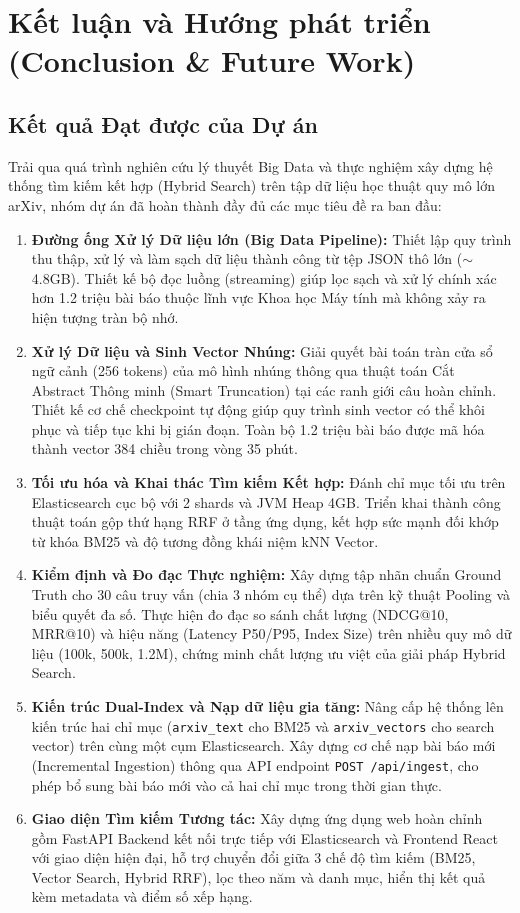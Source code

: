 \chapter{Kết luận và Hướng phát triển (Conclusion \& Future Work)}
\label{ch:conclusion}

\section{Kết quả Đạt được của Dự án}
Trải qua quá trình nghiên cứu lý thuyết Big Data và thực nghiệm xây dựng hệ thống tìm kiếm kết hợp (Hybrid Search) trên tập dữ liệu học thuật quy mô lớn arXiv, nhóm dự án đã hoàn thành đầy đủ các mục tiêu đề ra ban đầu:
\begin{enumerate}
    \item \textbf{Đường ống Xử lý Dữ liệu lớn (Big Data Pipeline):} Thiết lập quy trình thu thập, xử lý và làm sạch dữ liệu thành công từ tệp JSON thô lớn ($\sim$4.8GB). Thiết kế bộ đọc luồng (streaming) giúp lọc sạch và xử lý chính xác hơn 1.2 triệu bài báo thuộc lĩnh vực Khoa học Máy tính mà không xảy ra hiện tượng tràn bộ nhớ.
    \item \textbf{Xử lý Dữ liệu và Sinh Vector Nhúng:} Giải quyết bài toán tràn cửa sổ ngữ cảnh (256 tokens) của mô hình nhúng thông qua thuật toán Cắt Abstract Thông minh (Smart Truncation) tại các ranh giới câu hoàn chỉnh. Thiết kế cơ chế checkpoint tự động giúp quy trình sinh vector có thể khôi phục và tiếp tục khi bị gián đoạn. Toàn bộ 1.2 triệu bài báo được mã hóa thành vector 384 chiều trong vòng 35 phút.
    \item \textbf{Tối ưu hóa và Khai thác Tìm kiếm Kết hợp:} Đánh chỉ mục tối ưu trên Elasticsearch cục bộ với 2 shards và JVM Heap 4GB. Triển khai thành công thuật toán gộp thứ hạng RRF ở tầng ứng dụng, kết hợp sức mạnh đối khớp từ khóa BM25 và độ tương đồng khái niệm kNN Vector.
    \item \textbf{Kiểm định và Đo đạc Thực nghiệm:} Xây dựng tập nhãn chuẩn Ground Truth cho 30 câu truy vấn (chia 3 nhóm cụ thể) dựa trên kỹ thuật Pooling và biểu quyết đa số. Thực hiện đo đạc so sánh chất lượng (NDCG@10, MRR@10) và hiệu năng (Latency P50/P95, Index Size) trên nhiều quy mô dữ liệu (100k, 500k, 1.2M), chứng minh chất lượng ưu việt của giải pháp Hybrid Search.
    \item \textbf{Kiến trúc Dual-Index và Nạp dữ liệu gia tăng:} Nâng cấp hệ thống lên kiến trúc hai chỉ mục (\texttt{arxiv\_text} cho BM25 và \texttt{arxiv\_vectors} cho search vector) trên cùng một cụm Elasticsearch. Xây dựng cơ chế nạp bài báo mới (Incremental Ingestion) thông qua API endpoint \texttt{POST /api/ingest}, cho phép bổ sung bài báo mới vào cả hai chỉ mục trong thời gian thực.
    \item \textbf{Giao diện Tìm kiếm Tương tác:} Xây dựng ứng dụng web hoàn chỉnh gồm FastAPI Backend kết nối trực tiếp với Elasticsearch và Frontend React với giao diện hiện đại, hỗ trợ chuyển đổi giữa 3 chế độ tìm kiếm (BM25, Vector Search, Hybrid RRF), lọc theo năm và danh mục, hiển thị kết quả kèm metadata và điểm số xếp hạng.
\end{enumerate}

